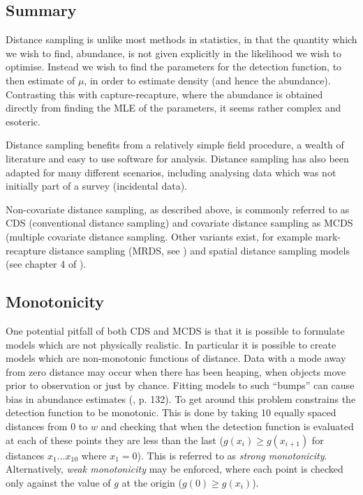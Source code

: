 \subsection{Summary}
Distance sampling is unlike most methods in statistics, in that the quantity which we wish to find, abundance, is not given explicitly in the likelihood we wish to optimise. Instead we wish to find the parameters for the detection function, to then estimate of $\mu$, in order to estimate density (and hence the abundance). Contrasting this with capture-recapture, where the abundance is obtained directly from finding the MLE of the parameters, it seems rather complex and esoteric. 

Distance sampling benefits from a relatively simple field procedure, a wealth of literature and easy to use software for analysis. Distance sampling has also been adapted for many different scenarios, including analysing data which was not initially part of a survey (incidental data).

Non-covariate distance sampling, as described above, is commonly referred to as CDS (conventional distance sampling) and covariate distance sampling as MCDS (multiple covariate distance sampling. Other variants exist, for example mark-recapture distance sampling (MRDS, see \cite{mrdspaper}) and spatial distance sampling models (see chapter 4 of \cite{ADS}).

\subsection{Monotonicity}
One potential pitfall of both CDS and MCDS is that  it is possible to formulate models which are not physically realistic. In particular it is possible to create models which are non-monotonic functions of distance. Data with a mode away from zero distance may occur when there has been heaping, when objects move prior to observation or just by chance. Fitting models to such ``bumps'' can cause bias in abundance estimates (\cite{IDS}, p. 132). To get around this problem \cite{distance-software} constrains the detection function to be monotonic. This is done by taking 10 equally spaced distances from $0$ to $w$ and checking that when the detection function is evaluated at each of these points they are less than the last ($g(x_i)\geq g(x_{i+1})$ for distances $x_1 \dots x_{10}$ where $x_1=0$). This is referred to as \textit{strong monotonicity}. Alternatively, \textit{weak monotonicity} may be enforced, where each point is checked only against the value of $g$ at the origin ($g(0)\geq g(x_i)$).

